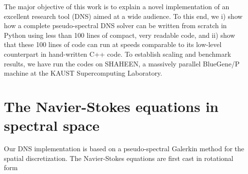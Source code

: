 \documentclass[11pt, oneside]{article}
\begin{document}
The major objective of this work is to explain a novel implementation of an excellent research tool (DNS) aimed at a wide audience. To this end, we i) show how a complete pseudo-spectral DNS solver can be written from scratch in Python using less than 100 lines of compact, very readable code, and ii) show that these 100 lines of code can run at speeds comparable to its low-level counterpart in hand-written C++ code. To establish scaling and benchmark results, we have run the codes on SHAHEEN, a massively parallel BlueGene/P machine at the KAUST Supercomputing Laboratory.

\section{The Navier-Stokes equations in spectral space}
Our DNS implementation is based on a pseudo-spectral Galerkin method \cite{canuto1987} for the spatial discretization. The Navier-Stokes equations are first cast in rotational form
\end{document}
